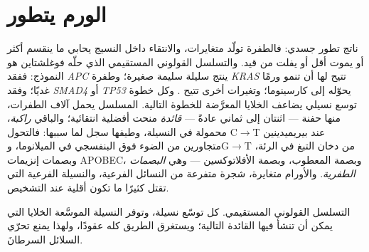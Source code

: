 \section{الورم يتطور}

\begin{proposition}\label{prop:b3:cancer-biology:multistep}
 ناتج تطور جسدي: فالطفرة تولّد
متغايرات، والانتقاء داخل النسيج يحابي ما ينقسم
أكثر أو يموت أقل أو يفلت من قيد. والتسلسل القولوني المستقيمي
الذي حلّه فوغلشتاين هو النموذج: ففقد \emph{APC} ينتج
سليلة سليمة صغيرة؛ وطفرة \emph{KRAS} تتيح لها أن تنمو ورمًا
غديًا؛ وفقد \emph{SMAD4} أو \emph{TP53} يحوّله إلى كارسينوما؛
وتغيرات أخرى تتيح . وكل خطوة توسع نسيلي
يضاعف الخلايا المعرَّضة للخطوة التالية.  المسلسل يحمل
آلاف الطفرات، منها حفنة --- اثنتان إلى ثماني عادةً
--- \emph{قائدة} منحت أفضلية انتقائية؛ والباقي
\emph{راكبة}، محمولة في النسيلة، وطيفها
سجل لما سببها: فالتحول C$\to$T عند بيريميدينين متجاورين من
الضوء فوق البنفسجي في الميلانوما، وG$\to$T من دخان التبغ في 
الرئة، وبصمات إنزيمات APOBEC، وبصمة 
المعطوب، وبصمة الأفلاتوكسين --- وهي \emph{البصمات الطفرية}. والأورام
متغايرة، شجرة متفرعة من النسائل الفرعية، والنسيلة الفرعية التي
تقتل كثيرًا ما تكون أقلية عند التشخيص.
\end{proposition}

\begin{omfigure}

{\small التسلسل القولوني المستقيمي. كل  توسّع نسيلة،
وتوفر النسيلة الموسَّعة الخلايا التي يمكن أن تنشأ فيها القائدة
التالية؛ ويستغرق الطريق كله عقودًا، ولهذا يمنع تحرّي
السلائل السرطانَ.}
\end{omfigure}

